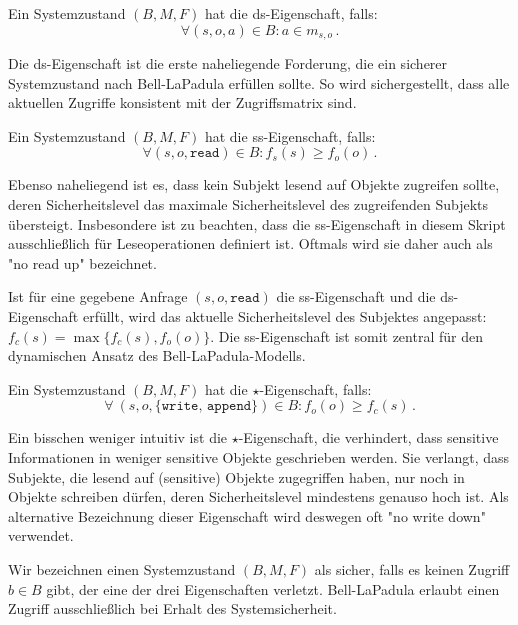 \begin{definition}\indexBLPDiscretionarySecurity
  Ein Systemzustand \((B, M, F)\) hat die ds-Eigenschaft, falls:
  \[
    \forall (s, o, a) \in B : a \in m_{s,o}\, .
  \]
\end{definition}

Die ds-Eigenschaft ist die erste naheliegende Forderung, die ein
sicherer Systemzustand nach Bell-LaPadula erfüllen sollte. So wird
sichergestellt, dass alle aktuellen Zugriffe konsistent mit der
Zugriffsmatrix sind.

\begin{definition}\indexBLPSimpleSecurity
  Ein Systemzustand \((B, M, F)\) hat die ss-Eigenschaft, falls:
  \[
    \forall (s, o, \texttt{read}) \in B : f_s(s) \geq f_o(o)\, .
  \]
\end{definition}

Ebenso naheliegend ist es, dass kein Subjekt lesend auf Objekte
zugreifen sollte, deren Sicherheitslevel das maximale Sicherheitslevel
des zugreifenden Subjekts übersteigt. Insbesondere ist zu beachten, dass
die ss-Eigenschaft in diesem Skript ausschließlich für Leseoperationen
definiert ist. Oftmals wird sie daher auch als "{}no read up"{}
bezeichnet.

Ist für eine gegebene Anfrage \((s, o, \texttt{read})\) die
ss-Eigenschaft und die ds-Eigenschaft erfüllt, wird das aktuelle
Sicherheitslevel des Subjektes angepasst: \(f_c(s) = \max \{f_c(s),
f_o(o)\}\). Die ss-Eigenschaft ist somit zentral für den dynamischen
Ansatz des Bell-LaPadula-Modells.

\begin{definition}\indexBLPStarProperty
  Ein Systemzustand \((B, M, F)\) hat die \(\star\)-Eigenschaft, falls: 
  \[
    \forall\ (s, o, \texttt{\{write, append\}}) \in B : f_o(o) \geq f_c(s)\, .
  \]
\end{definition}

Ein bisschen weniger intuitiv ist die \(\star\)-Eigenschaft, die
verhindert, dass sensitive Informationen in weniger sensitive Objekte
geschrieben werden. Sie verlangt, dass Subjekte, die lesend auf
(sensitive) Objekte zugegriffen haben, nur noch in Objekte schreiben
dürfen, deren Sicherheitslevel mindestens genauso hoch ist. Als
alternative Bezeichnung dieser Eigenschaft wird deswegen oft "{}no write
down"{} verwendet.

Wir bezeichnen einen Systemzustand \((B, M, F)\) \indexBLPSystemStatus
als sicher, falls es keinen Zugriff \(b \in B\) gibt, der eine der drei
Eigenschaften verletzt. Bell-LaPadula erlaubt einen Zugriff
ausschließlich bei Erhalt des Systemsicherheit.

